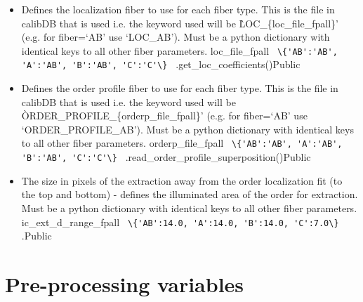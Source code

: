 \begin{itemize}
\item {}
{Defines the localization fiber to use for each fiber type. This is the file in calibDB that is used i.e. the keyword \masterCALIBDBfile used will be \`LOC\_\{loc\_file\_fpall\}' (e.g. for fiber=`AB' use `LOC\_AB'). Must be a python dictionary with identical keys to all other fiber parameters.}
{loc\_file\_fpall}
{\lstinline[style=pythoninline]| \{'AB':'AB', 'A':'AB', 'B':'AB', 'C':'C'\} |}
{\calextractRAW}{\constantsfile}
{\spirouLOCOR.get\_loc\_coefficients()}{Public}

\item {}
{Defines the order profile fiber to use for each fiber type. This is the file in calibDB that is used i.e. the keyword \masterCALIBDBfile used will be \`ORDER\_PROFILE\_\{orderp\_file\_fpall\}' (e.g. for fiber=`AB' use `ORDER\_PROFILE\_AB'). Must be a python dictionary with identical keys to all other fiber parameters.}
{orderp\_file\_fpall}
{\lstinline[style=pythoninline]| \{'AB':'AB', 'A':'AB', 'B':'AB', 'C':'C'\} |}
{\calextractRAW}{\constantsfile}
{\spirouFITS.read\_order\_profile\_superposition()}{Public}

\item {}
{The size in pixels of the extraction away from the order localization fit (to the top and bottom) - defines the illuminated area of the order for extraction. Must be a python dictionary with identical keys to all other fiber parameters.}
{ic\_ext\_d\_range\_fpall}
{\lstinline[style=pythoninline]| \{'AB':14.0, 'A':14.0, 'B':14.0, 'C':7.0\} |}
{\calDRIFTRAW}{\constantsfile}
{\calDRIFTRAW.\progMAIN}{Public}

\end{itemize}




\clearpage
\newpage
\section{Pre-processing variables}
\label{ch:variables:preprocessing}

